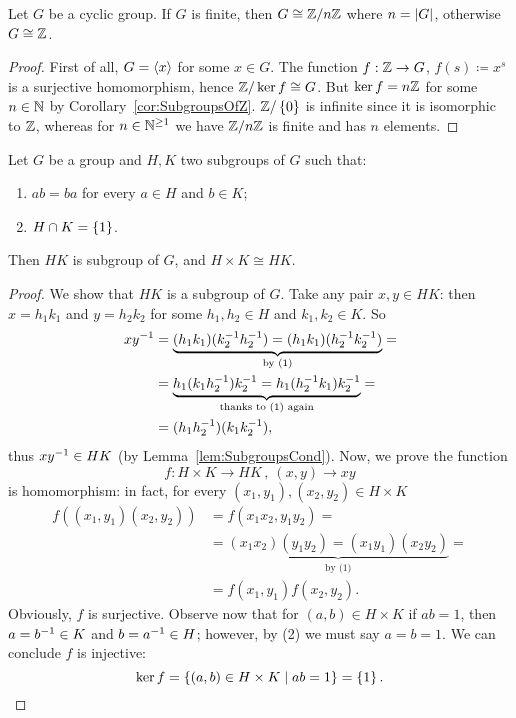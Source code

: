 \begin{proposition}\label{prop:CyclicClassification}
Let \(G\) be a cyclic group. If \(G\) is finite, then \(G \cong \mathbb Z/n\mathbb Z\) where \(n = \left\lvert G\right\rvert\), otherwise \(G \cong \mathbb Z\).
\end{proposition}

\begin{proof}
First of all, \(G = \left\langle x\right\rangle\) for some \(x \in G\). The function \(f : \mathbb Z \to G\), \(f(s) \coloneq x^s\) is a surjective homomorphism, hence \(\mathbb Z/\ker f \cong G\). But \(\ker f = n\mathbb Z\) for some \(n \in \mathbb N\) by Corollary~\ref{cor:SubgroupsOfZ}. \(\mathbb Z/\left\{0\right\}\) is infinite since it is isomorphic to \(\mathbb Z\), whereas for \(n \in \mathbb N^{\ge 1}\) we have \(\mathbb Z/n\mathbb Z\) is finite and has \(n\) elements.
\end{proof}

\begin{lemma}\label{lem:CartesianIso}
Let \(G\) be a group and \(H, K\) two subgroups of \(G\) such that:
\begin{enumerate}
\item \(ab = ba\) for every \(a \in H\) and \(b \in K\);
\item \(H \cap K = \left\{1\right\}\).
\end{enumerate}
Then \(HK\) is subgroup of \(G\), and \(H \times K \cong HK\).
\end{lemma}

\begin{proof}
We show that \(HK\) is a subgroup of \(G\). Take any pair \(x, y \in HK\): then \(x = h_1k_1\) and \(y = h_2k_2\) for some \(h_1, h_2 \in H\) and \(k_1, k_2 \in K\). So
\begin{align*}
x y^{-1} & = \underbrace{(h_1k_1) (k^{-1}_2 h^{-1}_2) = (h_1k_1) (h^{-1}_2 k^{-1}_2)}_{\text{by (1)}} = \\
& = \underbrace{h_1 (k_1 h^{-1}_2) k^{-1}_2 = h_1 (h^{-1}_2 k_1) k^{-1}_2}_{\text{thanks to (1) again}} = \\
 & = (h_1 h^{-1}_2) (k_1 k^{-1}_2) ,
\end{align*}
thus \(x y^{-1} \in HK\) (by Lemma~\ref{lem:SubgroupsCond}). Now, we prove the function
\[f : H \times K \to HK\,, \ (x, y) \to xy\]
is homomorphism: in fact, for every \((x_1, y_1), (x_2, y_2) \in H \times K\)
\begin{align*}
f((x_1, y_1) (x_2, y_2)) & = f(x_1x_2, y_1y_2) = \\
                         & = \underbrace{(x_1x_2)(y_1y_2) = (x_1y_1)(x_2y_2)}_{\text{by (1)}} = \\
                         & = f(x_1, y_1) f(x_2, y_2) .
\end{align*}
Obviously, \(f\) is surjective. Observe now that for \((a, b) \in H \times K\) if \(ab = 1\), then \(a = b^{-1} \in K\) and \(b = a^{-1} \in H\); however, by (2) we must say \(a = b = 1\). We can conclude \(f\) is injective:
\[\ker f = \left\{(a, b) \in H \times K \mid ab = 1\right\} = \left\{1\right\} .\qedhere\]
\end{proof}

